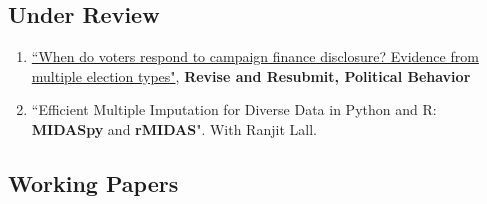 \documentclass[11pt, a4paper]{article}
\begin{document}
\subsection*{Under Review}

\begin{enumerate}  

  \item \href{https://ts-robinson.com/publication/robinson-whenvotersrespond-2021/robinson-whenvotersrespond-2021.pdf}{``When do voters respond to campaign finance disclosure? Evidence from multiple election types"}, \textbf{Revise and Resubmit, Political Behavior}

  \item ``Efficient Multiple Imputation for Diverse Data in Python and R: \textbf{MIDASpy} and \textbf{rMIDAS}". With Ranjit Lall.


\end{enumerate}

\subsection*{Working Papers}
\end{document}
